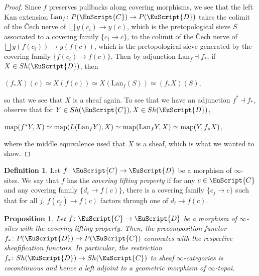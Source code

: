 \documentclass[oneside,a4paper]{amsart}
\newcommand{\euscr}[1]{\EuScript{#1}} %
\newcommand{\ccat}{\euscr{C}} %
\newcommand{\dcat}{\euscr{D}} %
\newcommand{\map}{\textnormal{map}} %
\theoremstyle{plain}
\newtheorem{prop}[thm]{Proposition}
\theoremstyle{definition}
\newtheorem{defin}[thm]{Definition}
\theoremstyle{remark}
\begin{document}
\begin{proof}
Since $f$ preserves pullbacks along covering morphisms, we see that the left Kan extension $\mathrm{Lan}_{f} \colon P(\ccat) \rightarrow P(\dcat)$ takes the colimit of the \v{C}ech nerve of $\bigsqcup y(c_{i}) \rightarrow y(c)$, which is the pretopological sieve $S$ associated to a covering family $\{ c_{i} \rightarrow c \}$, to the colimit of the \v{C}ech nerve of $\bigsqcup y(f(c_{i})) \rightarrow y(f(c))$, which is the pretopological sieve generated by the covering family $\{ f(c_{i}) \rightarrow f(c) \}$. Then by adjunction $\mathrm{Lan}_{f} \dashv f_{*}$, if $X \in Sh(\dcat)$, then 

\begin{center}
$(f_{*}X)(c) \simeq X(f(c)) \simeq X(\mathrm{Lan}_{f}(S)) \simeq (f_{*}X)(S)$,
\end{center}
so that we see that $X$ is a sheaf again. To see that we have an adjunction $f^{*} \dashv f_{*}$, observe that for $Y \in Sh(\ccat), X \in Sh(\dcat)$, 

\begin{center}
$\map(f^{*}Y, X) \simeq \map(L(\mathrm{Lan}_{f} Y), X) \simeq \map(\mathrm{Lan}_{f} Y, X) \simeq \map(Y, f_{*}X)$,
\end{center}
where the middle equivalence used that $X$ is a sheaf, which is what we wanted to show. 
\end{proof}

\begin{defin}
\label{defin:morphism_of_sites_with_covering_lifting_property}
Let $f \colon \ccat \rightarrow \dcat$ be a morphism of $\infty$-sites. We say that $f$ has the \emph{covering lifting property} if for any $c \in \ccat$ and any covering family $\{ d_{i} \rightarrow f(c) \}$, there is a covering family $\{ c_{j} \rightarrow c \}$ such that for all $j$, $f(c_{j}) \rightarrow f(c)$ factors through one of $d_{i} \rightarrow f(c)$. 
\end{defin}

\begin{prop}
\label{prop:morphisms_of_sites_with_covering_lifting_property_is_geometric}
Let $f \colon \ccat \rightarrow \dcat$ be a morphism of $\infty$-sites with the covering lifting property. Then, the precomposition functor $f_{*} \colon P(\dcat) \rightarrow P(\ccat)$ commutes with the respective sheafification functors. In particular, the restriction $f_{*} \colon Sh(\dcat) \rightarrow Sh(\ccat)$ to sheaf $\infty$-categories is cocontinuous and hence a left adjoint to a geometric morphism of $\infty$-topoi.
\end{prop}
\end{document}
